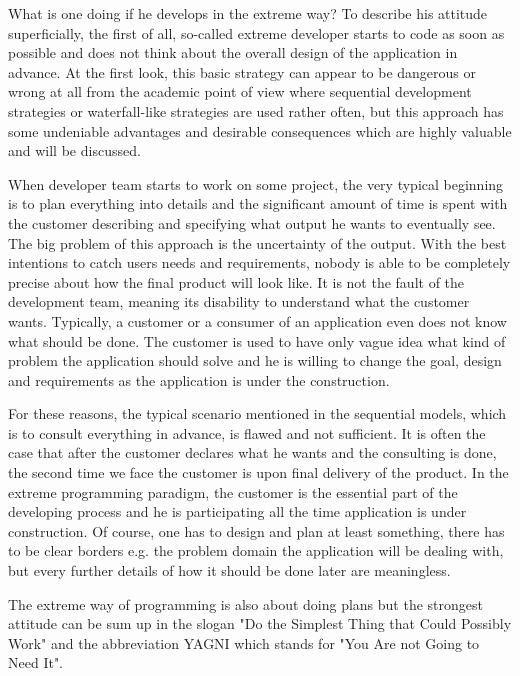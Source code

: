 \documentclass[12pt,final,oneside]{fithesis}
\begin{document}
What is one doing if he develops in the extreme way? To describe his attitude superficially, the first of all, so-called extreme developer starts to code as soon as possible and does not think about the overall design of the application in advance. At the first look, this basic strategy can appear to be dangerous or wrong at all from the academic point of view where sequential development strategies or waterfall-like strategies are used rather often, but this approach has some undeniable advantages and desirable consequences which are highly valuable and will be discussed.

When developer team starts to work on some project, the very typi\-cal beginning is to plan everything into details and the significant amount of time is spent with the customer describing and specifying what output he wants to eventually see. The big problem of this app\-roach is the uncertainty of the output. With the best intentions to catch users needs and requirements, nobody is able to be completely precise about how the final product will look like. It is not the fault of the development team, meaning its disability to understand what the customer wants. Typically, a customer or a consumer of an application even does not know what should be done. The customer is used to have only vague idea what kind of problem the application should solve and he is willing to change the goal, design and requirements as the application is under the construction.

For these reasons, the typical scenario mentioned in the sequential models, which is to consult everything in advance, is flawed and not sufficient. It is often the case that after the customer declares what he wants and the consulting is done, the second time we face the customer is upon final delivery of the product. In the extreme programming paradigm, the customer is the essential part of the developing process and he is participating all the time application is under construction. Of course, one has to design and plan at least something, there has to be clear borders e.g. the problem domain the application will be dealing with, but every further details of how it should be done later are meaningless.

The extreme way of programming is also about doing plans but the strongest attitude can be sum up in the slogan "Do the Simplest Thing that Could Possibly Work" and the abbreviation YAGNI which stands for "You Are not Going to Need It".
\end{document}
